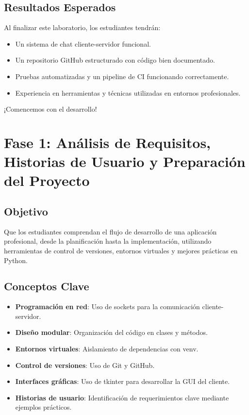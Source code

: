 \documentclass[
  a4paper,
  DIV=11,
  numbers=noendperiod,
  onepage,
  openany]{scrreprt}
\providecommand{\tightlist}{%
  \setlength{\itemsep}{0pt}\setlength{\parskip}{0pt}}\usepackage{longtable,booktabs,array}
\begin{document}
\section{Resultados Esperados}\label{resultados-esperados}

Al finalizar este laboratorio, los estudiantes tendrán:

\begin{itemize}
\tightlist
\item
  Un sistema de chat cliente-servidor funcional.
\item
  Un repositorio GitHub estructurado con código bien documentado.
\item
  Pruebas automatizadas y un pipeline de CI funcionando correctamente.
\item
  Experiencia en herramientas y técnicas utilizadas en entornos
  profesionales.
\end{itemize}

¡Comencemos con el desarrollo! 🎉

\chapter{Fase 1: Análisis de Requisitos, Historias de Usuario y
Preparación del
Proyecto}\label{fase-1-anuxe1lisis-de-requisitos-historias-de-usuario-y-preparaciuxf3n-del-proyecto}

\section{Objetivo}\label{objetivo-1}

Que los estudiantes comprendan el flujo de desarrollo de una aplicación
profesional, desde la planificación hasta la implementación, utilizando
herramientas de control de versiones, entornos virtuales y mejores
prácticas en Python.

\section{Conceptos Clave}\label{conceptos-clave-15}

\begin{itemize}
\tightlist
\item
  \textbf{Programación en red}: Uso de sockets para la comunicación
  cliente-servidor.
\item
  \textbf{Diseño modular}: Organización del código en clases y métodos.
\item
  \textbf{Entornos virtuales}: Aislamiento de dependencias con venv.
\item
  \textbf{Control de versiones}: Uso de Git y GitHub.
\item
  \textbf{Interfaces gráficas}: Uso de tkinter para desarrollar la GUI
  del cliente.
\item
  \textbf{Historias de usuario}: Identificación de requerimientos clave
  mediante ejemplos prácticos.
\end{itemize}
\end{document}
